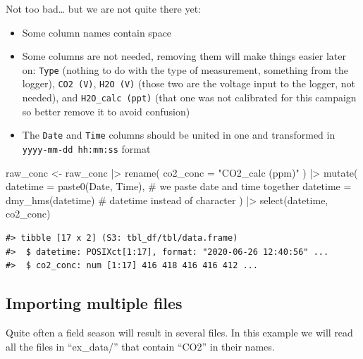 \documentclass[
  letterpaper,
  DIV=11,
  numbers=noendperiod]{scrartcl}
\newenvironment{Shaded}{\begin{snugshade}}{\end{snugshade}}
\newcommand{\AttributeTok}[1]{\textcolor[rgb]{0.40,0.45,0.13}{#1}}
\newcommand{\CommentTok}[1]{\textcolor[rgb]{0.37,0.37,0.37}{#1}}
\newcommand{\FunctionTok}[1]{\textcolor[rgb]{0.28,0.35,0.67}{#1}}
\newcommand{\NormalTok}[1]{\textcolor[rgb]{0.00,0.23,0.31}{#1}}
\newcommand{\OtherTok}[1]{\textcolor[rgb]{0.00,0.23,0.31}{#1}}
\newcommand{\SpecialCharTok}[1]{\textcolor[rgb]{0.37,0.37,0.37}{#1}}
\newcommand{\StringTok}[1]{\textcolor[rgb]{0.13,0.47,0.30}{#1}}
\providecommand{\tightlist}{%
  \setlength{\itemsep}{0pt}\setlength{\parskip}{0pt}}\usepackage{longtable,booktabs,array}
\begin{document}
Not too bad\ldots{} but we are not quite there yet:

\begin{itemize}
\tightlist
\item
  Some column names contain space
\item
  Some columns are not needed, removing them will make things easier
  later on: \texttt{Type} (nothing to do with the type of measurement,
  something from the logger), \texttt{CO2\ (V)}, \texttt{H2O\ (V)}
  (those two are the voltage input to the logger, not needed), and
  \texttt{H2O\_calc\ (ppt)} (that one was not calibrated for this
  campaign so better remove it to avoid confusion)
\item
  The \texttt{Date} and \texttt{Time} columns should be united in one
  and transformed in \texttt{yyyy-mm-dd\ hh:mm:ss} format
\end{itemize}

\begin{Shaded}
\begin{Highlighting}[]
\NormalTok{raw\_conc }\OtherTok{\textless{}{-}}\NormalTok{ raw\_conc }\SpecialCharTok{|\textgreater{}}
  \FunctionTok{rename}\NormalTok{(}
    \AttributeTok{co2\_conc =} \StringTok{"CO2\_calc (ppm)"}
\NormalTok{  ) }\SpecialCharTok{|\textgreater{}}
  \FunctionTok{mutate}\NormalTok{(}
    \AttributeTok{datetime =} \FunctionTok{paste0}\NormalTok{(Date, Time), }\CommentTok{\# we paste date and time together}
    \AttributeTok{datetime =} \FunctionTok{dmy\_hms}\NormalTok{(datetime) }\CommentTok{\# datetime instead of character}
\NormalTok{  ) }\SpecialCharTok{|\textgreater{}}
  \FunctionTok{select}\NormalTok{(datetime, co2\_conc)}
\end{Highlighting}
\end{Shaded}

\begin{verbatim}
#> tibble [17 x 2] (S3: tbl_df/tbl/data.frame)
#>  $ datetime: POSIXct[1:17], format: "2020-06-26 12:40:56" ...
#>  $ co2_conc: num [1:17] 416 418 416 416 412 ...
\end{verbatim}

\subsection{Importing multiple files}\label{importing-multiple-files}

Quite often a field season will result in several files. In this example
we will read all the files in ``ex\_data/'' that contain ``CO2'' in
their names.
\end{document}
